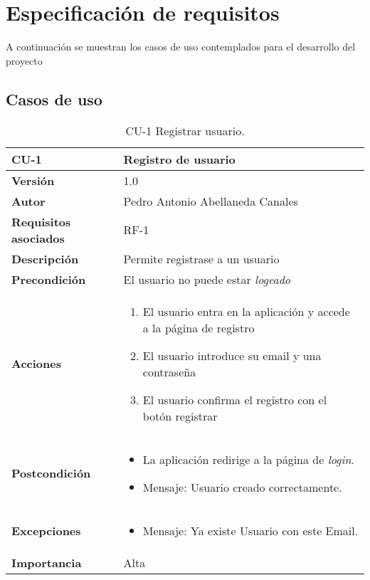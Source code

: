 \section{Especificación de requisitos}

A continuación se muestran los casos de uso contemplados para el desarrollo del proyecto 
\newpage
\subsection{Casos de uso}


\begin{table}[p]
	\centering
	\begin{tabularx}{\linewidth}{ p{} p{} }
		\toprule
		\textbf{CU-1}    & \textbf{Registro de usuario}\\
		\toprule
		\textbf{Versión}              & 1.0    \\
		\textbf{Autor}                & Pedro Antonio Abellaneda Canales \\
		\textbf{Requisitos asociados} & RF-1 \\
		\textbf{Descripción}          & Permite registrase a un usuario \\
		\textbf{Precondición}         & El usuario no puede estar \textit{logeado} \\
		\textbf{Acciones}             &
		\begin{enumerate}
			\def\labelenumi{\arabic{enumi}.}
			\tightlist
			\item El usuario entra en la aplicación y accede a la página de registro
			\item El usuario introduce su email y una contraseña
            \item El usuario confirma el registro con el botón registrar
		\end{enumerate}\\
		\textbf{Postcondición}        & \begin{itemize}
                                        \tightlist
		                                \item La aplicación redirige a la página de \textit{login}.
                                        \item Mensaje: Usuario creado correctamente.
		                              \end{itemize}  \\ 
                                      
		\textbf{Excepciones}          & \begin{itemize}
                                        \tightlist
		                                \item Mensaje: Ya existe Usuario con este Email.
		                              \end{itemize}  \\ 
		\textbf{Importancia}          & Alta \\
		\bottomrule
	\end{tabularx}
	\caption{CU-1 Registrar usuario.}
\end{table}


